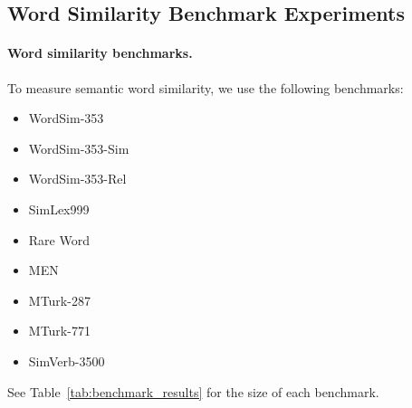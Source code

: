 \documentclass[11pt,a4paper]{article}
\begin{document}
    
    
    \subsection{Word Similarity Benchmark Experiments}\label{sec:benchmark_exp}
    
    \paragraph{Word similarity benchmarks.}
    
    To measure semantic word similarity, we use the following benchmarks:
    \begin{itemize}
        \item WordSim-353~\cite{finkelstein2001placing}
        \item WordSim-353-Sim~\cite{agirre2009study}
        \item WordSim-353-Rel~\cite{zesch2008using}
        \item SimLex999~\cite{hill2015simlex}
        \item Rare Word~\cite{luong2013better}
        \item MEN~\cite{bruni2012distributional}
        \item MTurk-287~\cite{radinsky2011word}
        \item MTurk-771~\cite{halawi2012large}
        \item SimVerb-3500~\cite{Gerz2016emnlp}
    \end{itemize}
    See Table~\ref{tab:benchmark_results} for the size of each benchmark.
    
\end{document}
